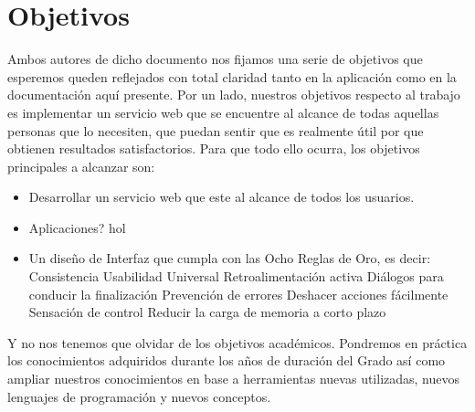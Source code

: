 \section{Objetivos}
Ambos autores de dicho documento nos fijamos una serie de objetivos que esperemos queden reflejados con total claridad tanto en la aplicación como en la documentación aquí presente. Por un lado, nuestros objetivos respecto al trabajo es implementar un servicio web  que se encuentre al alcance de todas aquellas personas que lo necesiten, que puedan sentir que es realmente útil por que obtienen resultados satisfactorios. Para que todo ello ocurra, los objetivos principales a alcanzar son:
\begin{itemize}
	\item Desarrollar un servicio web que este al alcance de todos los usuarios.	
	\item Aplicaciones? hol
	\item Un diseño de Interfaz que cumpla con las Ocho Reglas de Oro, es decir: 
	\subitem Consistencia
	\subitem Usabilidad Universal
	\subitem Retroalimentación activa
	\subitem Diálogos para conducir la finalización
	\subitem Prevención de errores
	\subitem Deshacer acciones fácilmente
	\subitem Sensación de control
	\subitem Reducir la carga de memoria a corto plazo
\end{itemize}
Y no nos tenemos que olvidar de los objetivos académicos. Pondremos en práctica los conocimientos adquiridos durante los años de duración del Grado así como ampliar nuestros conocimientos en base a herramientas nuevas utilizadas, nuevos lenguajes de programación y nuevos conceptos.